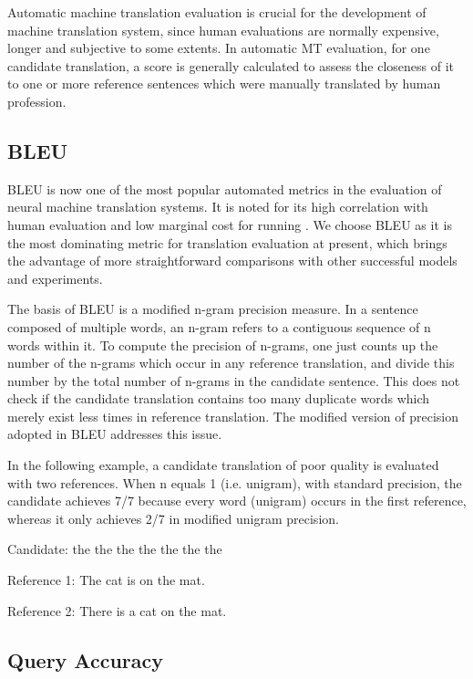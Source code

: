 Automatic machine translation evaluation is crucial for the development of machine translation system, since human evaluations are normally expensive, longer and subjective to some extents. In automatic MT evaluation, for one candidate translation, a score is generally calculated to assess the closeness of it to one or more reference sentences which were manually translated by human profession. 

\subsection{BLEU}

BLEU is now one of the most popular automated metrics in the evaluation of neural machine translation systems. It is noted for its high correlation with human evaluation and low marginal cost for running \cite{Papineni2002}. We choose BLEU as it is the most dominating metric for translation evaluation at present, which brings the advantage of more straightforward comparisons with other successful models and experiments.

The basis of BLEU is a modified n-gram precision measure. In a sentence composed of multiple words, an n-gram refers to a contiguous sequence of n words within it. To compute the precision of n-grams, one just counts up the number of the n-grams which occur in any reference translation, and divide this number by the total number of n-grams in the candidate sentence. This does not check if the candidate translation contains too many duplicate words which merely exist less times in reference translation. The modified version of precision adopted in BLEU addresses this issue. 

In the following example, a candidate translation of poor quality is evaluated with two references. When n equals 1 (i.e. unigram), with standard precision, the candidate achieves 7/7 because every word (unigram) occurs in the first reference, whereas it only achieves 2/7 in modified unigram precision. 

Candidate: the the the the the the the

Reference 1: The cat is on the mat.

Reference 2: There is a cat on the mat.



\subsection{Query Accuracy}


